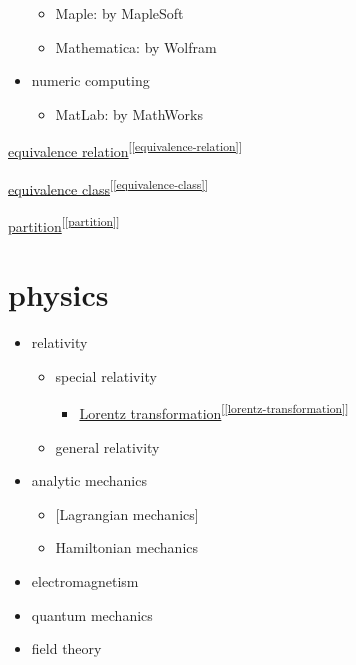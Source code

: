 \documentclass[
]{book}
\providecommand{\tightlist}{%
  \setlength{\itemsep}{0pt}\setlength{\parskip}{0pt}}
\theoremstyle{definition}
\theoremstyle{definition}
\theoremstyle{definition}
\theoremstyle{definition}
\theoremstyle{remark}
\begin{document}
\begin{itemize}
  \begin{itemize}
  \tightlist
  \item
    Maple: by MapleSoft
  \item
    Mathematica: by Wolfram
  \end{itemize}
\item
  numeric computing

  \begin{itemize}
  \tightlist
  \item
    MatLab: by MathWorks
  \end{itemize}
\end{itemize}

\protect\hyperlink{equivalence-relation}{equivalence relation}\textsuperscript{{[}\ref{equivalence-relation}{]}}

\protect\hyperlink{equivalence-class}{equivalence class}\textsuperscript{{[}\ref{equivalence-class}{]}}

\protect\hyperlink{partition}{partition}\textsuperscript{{[}\ref{partition}{]}}

\hypertarget{physics}{%
\chapter{physics}\label{physics}}

\begin{itemize}
\tightlist
\item
  relativity

  \begin{itemize}
  \tightlist
  \item
    special relativity

    \begin{itemize}
    \tightlist
    \item
      \protect\hyperlink{lorentz-transformation}{Lorentz transformation}\textsuperscript{{[}\ref{lorentz-transformation}{]}}
    \end{itemize}
  \item
    general relativity
  \end{itemize}
\item
  analytic mechanics

  \begin{itemize}
  \tightlist
  \item
    {[}Lagrangian mechanics{]}
  \item
    Hamiltonian mechanics
  \end{itemize}
\item
  electromagnetism
\item
  quantum mechanics
\item
  field theory
\end{itemize}
\end{document}
